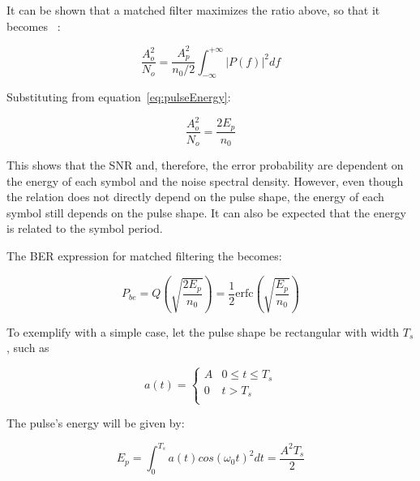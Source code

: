 \begin{refsection}
It can be shown that a matched filter maximizes the ratio above, so that it becomes~\cite{carlson1986communication} :

\begin{equation}
\frac{A_o^2}{N_o} = \frac{A_p^2}{n_0/2} \int_{-\infty}^{+\infty} |P(f)|^2 df
\end{equation}

Substituting from equation~\ref{eq:pulseEnergy}:

\begin{equation}
\frac{A_o^2}{N_o} = \frac{2 E_p}{n_0}
\end{equation}

This shows that the SNR and, therefore, the error probability are dependent on the energy of each symbol and the noise spectral density. However, even though the relation does not directly depend on the pulse shape, the energy of each symbol still depends on the pulse shape. It can also be expected that the energy is related to the symbol period.

The BER expression for matched filtering the becomes:

\begin{equation}\label{eq:berMQAMmf}
P_{be} =  Q\left(\sqrt{\frac{2 E_p}{{n_0}}}\right) = \frac{1}{2} \text{erfc}\left(\sqrt{\frac{E_p}{n_0}}\right) 
\end{equation}

To exemplify with a simple case, let the pulse shape be rectangular with width $T_s$, such as

\begin{equation*}
	a(t) = \begin{cases}
		A               & 0 \le t \le T_s\\
		0               & t > T_s\\
	\end{cases}
\end{equation*}

The pulse's energy will be given by:

\begin{equation}
E_p = \int_{0}^{T_s} {a(t)cos(\omega_0 t)}^2 dt = \frac{A^2 T_s}{2}
\end{equation}






\end{refsection}
